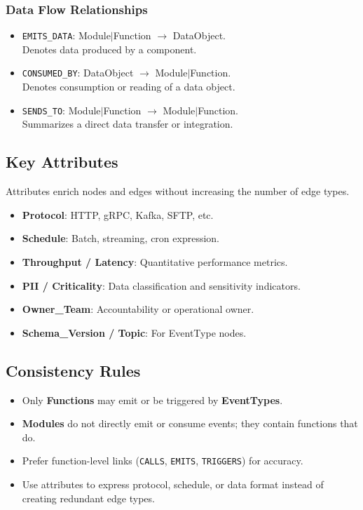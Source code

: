 \subsubsection{Data Flow Relationships}
\begin{itemize}
    \item \texttt{EMITS\_DATA}: Module$|$Function $\rightarrow$ DataObject.\\
    Denotes data produced by a component.
    \item \texttt{CONSUMED\_BY}: DataObject $\rightarrow$ Module$|$Function.\\
    Denotes consumption or reading of a data object.
    \item \texttt{SENDS\_TO}: Module$|$Function $\rightarrow$ Module$|$Function.\\
    Summarizes a direct data transfer or integration.
\end{itemize}

\subsection{Key Attributes}

Attributes enrich nodes and edges without increasing the number of edge types.

\begin{itemize}
    \item \textbf{Protocol}: HTTP, gRPC, Kafka, SFTP, etc.
    \item \textbf{Schedule}: Batch, streaming, cron expression.
    \item \textbf{Throughput / Latency}: Quantitative performance metrics.
    \item \textbf{PII / Criticality}: Data classification and sensitivity indicators.
    \item \textbf{Owner\_Team}: Accountability or operational owner.
    \item \textbf{Schema\_Version / Topic}: For EventType nodes.
\end{itemize}

\subsection{Consistency Rules}
\begin{itemize}
    \item Only \textbf{Functions} may emit or be triggered by \textbf{EventTypes}.
    \item \textbf{Modules} do not directly emit or consume events; they contain functions that do.
    \item Prefer function-level links (\texttt{CALLS}, \texttt{EMITS}, \texttt{TRIGGERS}) for accuracy.
    \item Use attributes to express protocol, schedule, or data format instead of creating redundant edge types.
\end{itemize}

